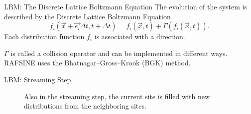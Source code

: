 \documentclass{beamer}
\begin{document}
\begin{frame}{LBM: The Discrete Lattice Boltzmann Equation}
The evolution of the system is described by the Discrete Lattice Boltzmann Equation
\begin{equation} \label{eq:dbe}
f_i(\vec{x} + \vec{e_i}\Delta t, t + \Delta t) = f_i(\vec{x}, t) + \Gamma(f_i(\vec{x}, t)).
\end{equation}
Each distribution function $f_i$ is associated with a direction.

$\Gamma$ is called a collision operator and can be implemented in different ways. RAFSINE uses the Bhatnagar--Gross--Krook (BGK) method.

\end{frame}

\begin{frame}{LBM: Streaming Step}
\begin{figure}[!htb]
\centering
\begin{minipage}[t]{.45\textwidth}
	\centering
	\begin{small}
	\def\svgwidth{0.9\linewidth}
	
	\end{small}
	\caption{Lattice streaming step, representing advection in a fluid. All functions $f_i$ are copied to the neighboring $f_i^{temp}$ in parallel.}
	\label{fig:d2q9_3}
\end{minipage}\qquad%
\begin{minipage}[t]{.45\textwidth}
	\centering
	\begin{small}
	\def\svgwidth{0.9\linewidth}
	
	\end{small}
	\caption{Also in the streaming step, the current site is filled with new distributions from the neighboring sites.}
	\label{fig:d2q9_4}
\end{minipage}
\end{figure}
\end{frame}
\end{document}
